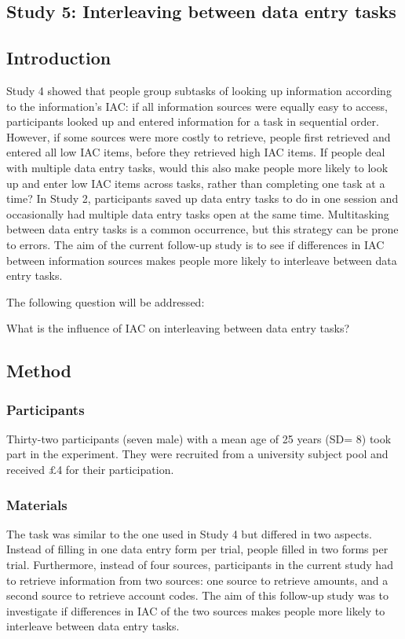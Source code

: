 \begin{table}
\begin{itemize}
\section{Study 5: Interleaving between data entry tasks}
 
\subsection{Introduction}
Study 4 showed that people group subtasks of looking up information according to the information's IAC: if all information sources were equally easy to access, participants looked up and entered information for a task in sequential order. However, if some sources were more costly to retrieve, people first retrieved and entered all low IAC items, before they retrieved high IAC items.
If people deal with multiple data entry tasks, would this also make people more likely to look up and enter low IAC items across tasks, rather than completing one task at a time? 
In Study 2, participants saved up data entry tasks to do in one session and occasionally had multiple data entry tasks open at the same time. Multitasking between data entry tasks is a common occurrence, but this strategy can be prone to errors.
The aim of the current follow-up study is to see if differences in IAC between information sources makes people more likely to interleave between data entry tasks.

The following question will be addressed:

What is the influence of IAC on interleaving between data entry tasks?

\subsection{Method}
\subsubsection{Participants}
Thirty-two participants (seven male) with a mean age of 25 years (SD= 8) took part in the experiment. They were recruited from a university subject pool and received $\pounds$4 for their participation.

\subsubsection{Materials}
The task was similar to the one used in Study 4 but differed in two aspects. Instead of filling in one data entry form per trial, people filled in two forms per trial. Furthermore, instead of four sources, participants in the current study had to retrieve information from two sources: one source to retrieve amounts, and a second source to retrieve account codes. The aim of this follow-up study was to investigate if differences in IAC of the two sources makes people more likely to interleave between data entry tasks.


\end{itemize}
\end{table}
